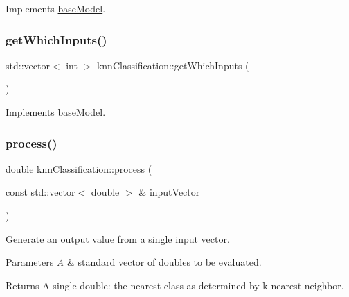 Implements \hyperlink{classbase_model_a1601088280ebe5be525fd1fe49d4b1e1}{base\+Model}.

\mbox{\label{classknn_classification_af7db9297f695e67df6af08719da37921}} 
\subsubsection{\texorpdfstring{get\+Which\+Inputs()}{getWhichInputs()}}
{\footnotesize\ttfamily std\+::vector$<$ int $>$ knn\+Classification\+::get\+Which\+Inputs (\begin{DoxyParamCaption}{ }\end{DoxyParamCaption})\hspace{0.3cm}{\ttfamily [virtual]}}



Implements \hyperlink{classbase_model_a5d6b7579536f5713eed0b7b4a6687a16}{base\+Model}.

\mbox{\label{classknn_classification_aedeef4367ed652c768eaf5682c8ec276}} 
\subsubsection{\texorpdfstring{process()}{process()}}
{\footnotesize\ttfamily double knn\+Classification\+::process (\begin{DoxyParamCaption}\item[{const std\+::vector$<$ double $>$ \&}]{input\+Vector }\end{DoxyParamCaption})\hspace{0.3cm}{\ttfamily [virtual]}}

Generate an output value from a single input vector. 
\begin{DoxyParams}{Parameters}
{\em A} & standard vector of doubles to be evaluated. \\
\hline
\end{DoxyParams}
\begin{DoxyReturn}{Returns}
A single double\+: the nearest class as determined by k-\/nearest neighbor. 
\end{DoxyReturn}


